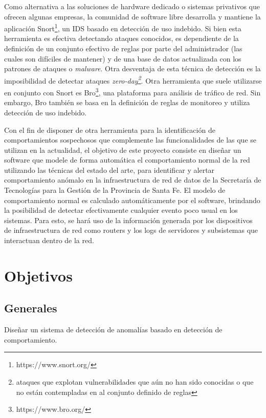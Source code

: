Como alternativa a las soluciones de hardware dedicado o sistemas privativos que ofrecen algunas empresas, la comunidad de software libre desarrolla y mantiene la aplicación Snort\footnote{https://www.snort.org/}, un IDS basado en detección de uso indebido. Si bien esta herramienta es efectiva detectando ataques conocidos, es dependiente de la definición de un conjunto efectivo de reglas por parte del administrador (las cuales son difíciles de mantener) y de una base de datos actualizada con los patrones de ataques o \textit{malware}. Otra desventaja de esta técnica de detección es la imposibilidad de detectar ataques \textit{zero-day\footnote{ataques que explotan vulnerabilidades que aún no han sido conocidas o que no están contempladas en al conjunto definido de reglas}}\cite{Milenkoski:2015:ECI:2808687.2808691}. Otra herramienta que suele utilizarse en conjunto con Snort es Bro\footnote{https://www.bro.org/}, una plataforma para análisis de tráfico de red. Sin embargo, Bro también se basa en la definición de reglas de monitoreo y utiliza detección de uso indebido. \par

Con el fin de disponer de otra herramienta para la identificación de comportamientos sospechosos que complemente las funcionalidades de las que se utilizan en la actualidad, el objetivo de este proyecto consiste en diseñar un software que modele de forma automática el comportamiento normal de la red utilizando las técnicas del estado del arte, para identificar y alertar comportamiento anómalo en la infraestructura de red de datos de la Secretaría de Tecnologías para la Gestión de la Provincia de Santa Fe. El modelo de comportamiento normal es calculado automáticamente por el software, brindando la posibilidad de detectar efectivamente cualquier evento poco usual en los sistemas. Para esto, se hará uso de la información generada por los dispositivos de infraestructura de red como routers y los logs de servidores y subsistemas que interactuan dentro de la red.

\section*{Objetivos}
\subsection*{Generales}
Diseñar un sistema de detección de anomalías basado en detección de comportamiento.
